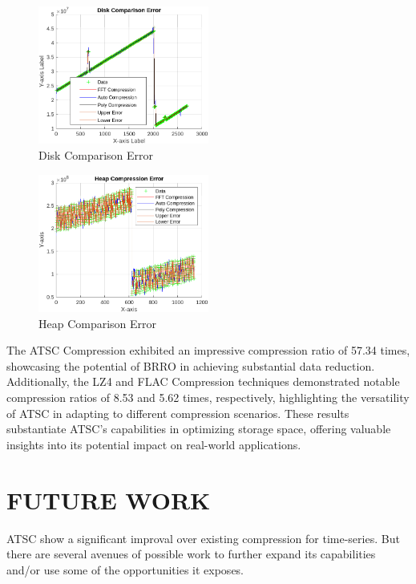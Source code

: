 \documentclass[conference]{IEEEtran}
\begin{document}
\begin{figure}[h]
    \centering
    \includegraphics[width=0.5\textwidth]{Disk.png}
    \caption{Disk Comparison Error}
    \label{Disk}
  \end{figure}

  \begin{figure}[h]
    \centering
    \includegraphics[width=0.5\textwidth]{heap.png}
    \caption{Heap Comparison Error}
    \label{heap}
  \end{figure}
\vspace{10pt}
The ATSC Compression exhibited an impressive compression ratio of 57.34 times, showcasing the potential of BRRO in achieving substantial data reduction. Additionally, the LZ4 and FLAC Compression techniques demonstrated notable compression ratios of 8.53 and 5.62 times, respectively, highlighting the versatility of ATSC in adapting to different compression scenarios. 
These results substantiate ATSC's capabilities in optimizing storage space, offering valuable insights into its potential impact on real-world applications. 

\section{FUTURE WORK}

ATSC show a significant improval over existing compression for time-series. But there are several avenues of possible work to further expand its capabilities and/or use some of the opportunities it exposes.
\end{document}
